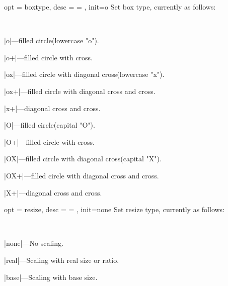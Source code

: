 \documentclass[full]{l3doc}
\begin{document}
\begin{documentation}
\begin{option}{ opt = boxtype, desc = {= }, init=o }
  Set box type, currently as follows:
\end{option}\\
  \begin{Description}
    \item |o|---filled circle(lowercase "o").
    \item |o+|---filled circle with cross.
    \item |ox|---filled circle with diagonal cross(lowercase "x").
    \item |ox+|---filled circle with diagonal cross and cross.
    \item |x+|---diagonal cross and cross.
    \item |O|---filled circle(capital "O").
    \item |O+|---filled circle with cross.
    \item |OX|---filled circle with diagonal cross(capital "X").
    \item |OX+|---filled circle with diagonal cross and cross.
    \item |X+|---diagonal cross and cross.
  \end{Description}
\begin{SideBySideExample}[frame=single,numbers=left,xrightmargin=.50\linewidth,gobble=2]
  \centering
  \quad
  \quad
  \quad
  \quad
\end{SideBySideExample}

\begin{SideBySideExample}[frame=single,numbers=left,xrightmargin=.50\linewidth,gobble=2]
  \centering
  \quad
  \quad
  \quad
  \quad
\end{SideBySideExample}

\bigskip

\begin{option}{ opt = resize, desc = {= }, init=none }
  Set resize type, currently as follows:
\end{option}\\
\begin{Description}
  \item |none|---No scaling.
  \item |real|---Scaling with real size or ratio.
  \item |base|---Scaling with base size.
\end{Description}
\begin{SideBySideExample}[frame=single,numbers=left,xrightmargin=.45\linewidth,gobble=2]
  \centering
  \quad
  \quad
\end{SideBySideExample}


\end{documentation}
\end{document}
